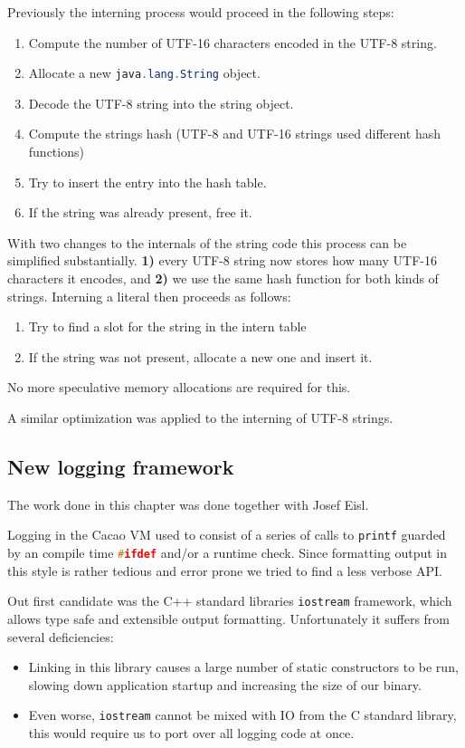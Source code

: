 \documentclass[12pt,a4paper,oneside]{article}
\newcommand{\cpp}[1]{\lstinline[language=C++]{#1}}
\newcommand{\java}[1]{\lstinline[language=Java]{#1}}
\begin{document}
	Previously the interning process would proceed in the following steps:
	\begin{enumerate}[label=\alph*)]
		\item Compute the number of UTF-16 characters encoded in the UTF-8 string.
		\item Allocate a new \java{java.lang.String} object.
		\item Decode the UTF-8 string into the string object.
		\item Compute the strings hash (UTF-8 and UTF-16 strings used different hash functions)
		\item Try to insert the entry into the hash table.
		\item If the string was already present, free it.
	\end{enumerate}

	With two changes to the internals of the string code this process can be simplified substantially.
	\textbf{1)} every UTF-8 string now stores how many UTF-16 characters it encodes, and 
	\textbf{2)} we use the same hash function for both kinds of strings.
	Interning a literal then proceeds as follows:
	\begin{enumerate}[label=\alph*)]
		\item Try to find a slot for the string in the intern table
		\item If the string was not present, allocate a new one and insert it.
	\end{enumerate}
	No more speculative memory allocations are required for this.

	A similar optimization was applied to the interning of UTF-8 strings.

\subsection{New logging framework}
	The work done in this chapter was done together with Josef Eisl.

	Logging in the Cacao VM used to consist of a series of calls to \cpp{printf} guarded by 
	an compile time \cpp{#ifdef} and/or a runtime check.
	Since formatting output in this style is rather tedious and error prone we tried to find a less
	verbose API.

	Out first candidate was the C++ standard libraries \cpp{iostream} framework, which allows type safe and
	extensible output formatting.
	Unfortunately it suffers from several deficiencies:
	\begin{itemize}
		\item Linking in this library causes a large number of static constructors to be run, slowing down application startup
		      and increasing the size of our binary.
		\item Even worse, \cpp{iostream} cannot be mixed with IO from the C standard library, this would require us to 
		      port over all logging code at once.
	\end{itemize}
\end{document}
